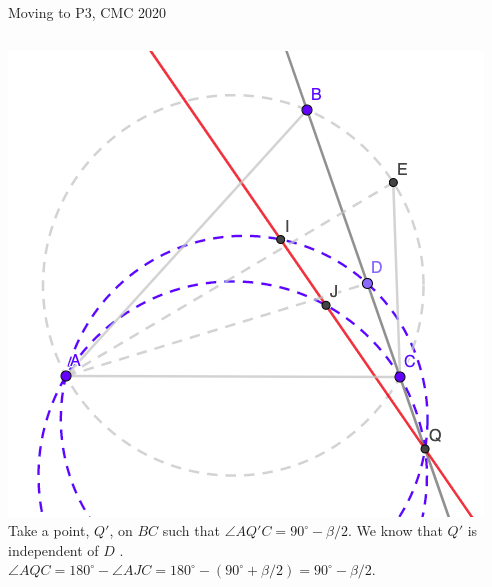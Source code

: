 \documentclass{beamer}
\begin{document}
\begin{frame}{Moving to P3, CMC 2020}
	\begin{columns}
		\includegraphics[scale=0.34]{spi11.png}
		Take a point, $Q'$, on $BC$ such that $\angle AQ'C = 
		90^\circ - \beta/2$. We know that $Q'$ is independent of $D$
		.\\
		\phantom{Spacing}
		$\angle AQC = 180^\circ - \angle AJC = 180^\circ - 
		(90^\circ + \beta /  2) = 90^\circ - \beta / 2$.
	\end{columns}
\end{frame}
\end{document}
